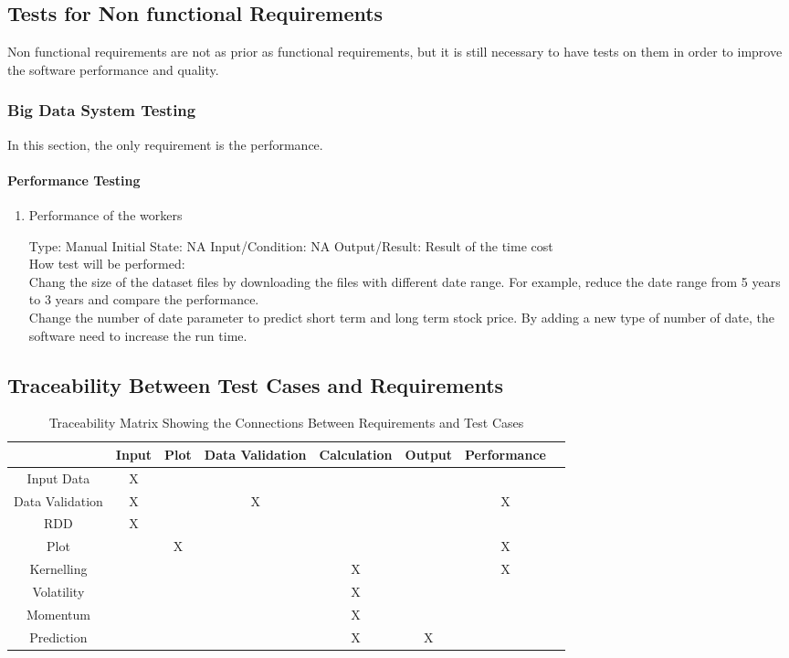 \documentclass[12pt, titlepage]{article}
\begin{document}
\subsection{Tests for Non functional Requirements}
Non functional requirements are not as prior as functional requirements, but it is still necessary to have tests on them in order to improve the software performance and quality.
\subsubsection{Big Data System Testing}
In this section, the only requirement is the performance.
\paragraph{ Performance Testing}

\begin{enumerate}

\item{Performance of the workers\\}

Type: Manual
Initial State: NA
Input/Condition: NA
Output/Result: Result of the time cost\\
How test will be performed: \\
Chang the size of the dataset files by downloading the files with different date range. For example, reduce the date range from 5 years to 3 years and compare the performance. \\
Change the number of date parameter to predict short term and long term stock price. By adding a new type of number of date, the software need to increase the run time. \\


\end{enumerate}

\newpage
\subsection{Traceability Between Test Cases and Requirements}

\begin{table}[h!]
\centering
\begin{tabular}{|c|c|c|c|c|c|c|c|}
\hline
& Input & Plot & Data Validation & Calculation & Output& Performance\\
\hline
Input Data &X & & & & \\ \hline
Data Validation &X & &X & & &X \\ \hline
RDD &X & & & & & & \\ \hline
Plot & &X & & & &X \\ \hline
Kernelling & & & & X& &X \\ \hline
Volatility & & & &X & & \\ \hline 
Momentum & & & &X & & \\ \hline 
Prediction & & & &X &X & \\ \hline 


\end{tabular}
\caption{Traceability Matrix Showing the Connections Between Requirements and Test Cases}
\label{Table:R_trace}
\end{table}
\end{document}
